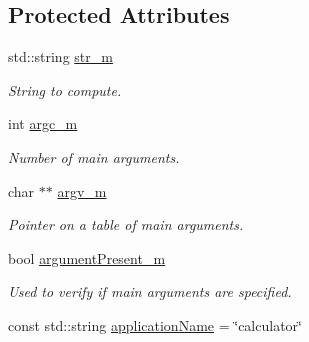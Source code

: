 \subsection*{Protected Attributes}
\begin{DoxyCompactItemize}
\item 
\hypertarget{class_application_a6b854bee68b76d31b8b2fb3e8d718e93}{}std\+::string \hyperlink{class_application_a6b854bee68b76d31b8b2fb3e8d718e93}{str\+\_\+m}\label{class_application_a6b854bee68b76d31b8b2fb3e8d718e93}

\begin{DoxyCompactList}\small\item\em String to compute. \end{DoxyCompactList}\item 
\hypertarget{class_application_ad1899c23670e3e62d65c79d2b5cab185}{}int \hyperlink{class_application_ad1899c23670e3e62d65c79d2b5cab185}{argc\+\_\+m}\label{class_application_ad1899c23670e3e62d65c79d2b5cab185}

\begin{DoxyCompactList}\small\item\em Number of main arguments. \end{DoxyCompactList}\item 
\hypertarget{class_application_aab5c326977c668262c049dadc87c09d3}{}char $\ast$$\ast$ \hyperlink{class_application_aab5c326977c668262c049dadc87c09d3}{argv\+\_\+m}\label{class_application_aab5c326977c668262c049dadc87c09d3}

\begin{DoxyCompactList}\small\item\em Pointer on a table of main arguments. \end{DoxyCompactList}\item 
\hypertarget{class_application_a09431f64a225af0307dc85797f5275bb}{}bool \hyperlink{class_application_a09431f64a225af0307dc85797f5275bb}{argument\+Present\+\_\+m}\label{class_application_a09431f64a225af0307dc85797f5275bb}

\begin{DoxyCompactList}\small\item\em Used to verify if main arguments are specified. \end{DoxyCompactList}\item 
\hypertarget{class_application_a623fc4a7c938a553a38c1e6c467c0d51}{}const std\+::string \hyperlink{class_application_a623fc4a7c938a553a38c1e6c467c0d51}{application\+Name} = \char`\"{}calculator\char`\"{}\label{class_application_a623fc4a7c938a553a38c1e6c467c0d51}


\end{DoxyCompactItemize}
